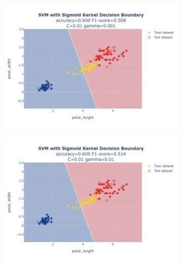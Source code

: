 \documentclass{article}
\begin{document}
\begin{figure}
    \begin{subfigure}{0.3\textwidth}
        \centering
        \includegraphics[scale=.13]{images/implementation/q1/sigmoid_kernel/petal_length_petal_width_0.01_0.001.png}
    \end{subfigure}
    \hfill
    \begin{subfigure}{0.3\textwidth}
        \centering
        \includegraphics[scale=.13]{images/implementation/q1/sigmoid_kernel/petal_length_petal_width_0.01_0.01.png}
    \end{subfigure}
    \hfill
    \begin{subfigure}{0.3\textwidth}
        \centering

\end{subfigure}
\end{figure}
\end{document}
